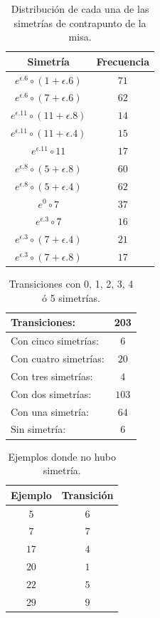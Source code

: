 \documentclass[letterpaper,12pt]{book}
\theoremstyle{definition} \newtheorem{Def}{Definición}[chapter]
\theoremstyle{definition} \newtheorem{Teo}{Teorema}[chapter]
\theoremstyle{definition} \newtheorem{Pro}{Proposición}[chapter]
\theoremstyle{definition} \newtheorem{Lema}{Lema}[chapter]
\begin{document}
\begin{table}[h]
\centering
\begin{tabular}{| c | c |}
\hline
Simetría & Frecuencia\\
\hline
$e^{\epsilon{.}6}\circ (1+\epsilon{.}6)$ & $71$\\
$e^{\epsilon{.}6}\circ (7+\epsilon{.}6)$ & $62$\\
$e^{\epsilon{.}11}\circ(11+\epsilon{.}8)$& $14$\\
$e^{\epsilon{.}11}\circ(11+\epsilon{.}4)$ & $15$\\
$e^{\epsilon{.}11}\circ 11$ & $17$\\
$e^{\epsilon{.}8}\circ (5+\epsilon{.}8)$ & $60$\\
$e^{\epsilon{.}8}\circ (5+\epsilon{.}4)$ & $62$\\
$e^{0}\circ 7$ & $37$\\
$e^{\epsilon{.}3}\circ 7$ & $16$\\
$e^{\epsilon{.}3}\circ (7+\epsilon{.}4)$ & $21$\\
$e^{\epsilon{.}3}\circ(7+\epsilon{.}8)$ & $17$\\
\hline
\end{tabular}
\caption{\label{Simetrias1}Distribución de cada una de las simetrías de contrapunto de la misa.}
\end{table}           

\begin{table}[h]
\centering
\begin{tabular}{| l  c |}
\hline
Transiciones: & 203\\
\hline
Con cinco simetrías: & $6$ \\
Con cuatro simetrías: & $20$ \\
Con tres simetrías: & $4$ \\
Con dos simetrías: & $103$ \\
Con una simetría: & $64$ \\
Sin simetría: & $6$ \\
\hline
\end{tabular}
\caption{\label{Simetrias2}Transiciones con 0, 1, 2, 3, 4 ó 5 simetrías.}
\end{table}   

\begin{table}[h]
\centering
\begin{tabular}{| c | c |}
\hline
Ejemplo & Transición \\
\hline
$5$ & $6$ \\
$7$ & $7$ \\
$17$ & $4$ \\
$20$ & $1$ \\
$22$ & $5$ \\
$29$ & $9$ \\
\hline
\end{tabular}
\caption{\label{NoSimetrias}Ejemplos donde no hubo simetría.}
\end{table}  
\end{document}

